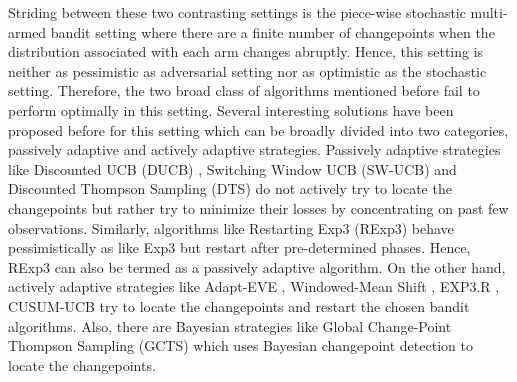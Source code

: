 Striding between these two contrasting settings is the piece-wise stochastic multi-armed bandit setting where there are a finite number of changepoints when the distribution associated with each arm changes abruptly. Hence, this setting is neither as pessimistic as adversarial setting nor as optimistic as the stochastic setting. Therefore, the two broad class of algorithms mentioned before fail to perform optimally in this setting. Several interesting solutions have been proposed before for this setting which can be broadly divided into two categories, passively adaptive and actively adaptive strategies. Passively adaptive strategies like Discounted UCB (DUCB) \citep{kocsis2006discounted}, Switching Window UCB (SW-UCB)  \citep{garivier2011upper} and Discounted Thompson Sampling (DTS) \citep{raj2017taming} do not actively try to locate the changepoints but rather try to minimize their losses by concentrating on past few observations. Similarly, algorithms like Restarting Exp3 (RExp3) \citep{DBLP:journals/corr/BesbesGZ14} behave pessimistically as like Exp3 but restart after pre-determined phases. Hence, RExp3 can also be termed as a passively adaptive algorithm. On the other hand, actively adaptive strategies like Adapt-EVE \citep{hartland2007change}, Windowed-Mean Shift \citep{yu2009piecewise}, EXP3.R \citep{allesiardo2017non}, CUSUM-UCB \citep{liu2017change} try to locate the changepoints and restart the chosen bandit algorithms. Also, there are Bayesian strategies like Global Change-Point Thompson Sampling (GCTS)\citep{mellor2013thompson} which uses Bayesian changepoint detection to locate the changepoints. 